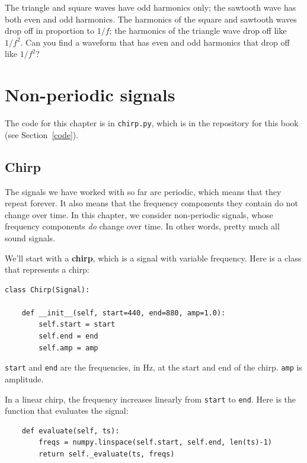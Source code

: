 \documentclass[12pt]{book}
\begin{document}
\begin{exercise}
The triangle and square waves have odd harmonics only; the sawtooth
wave has both even and odd harmonics.  The harmonics of the
square and sawtooth waves drop off in proportion to $1/f$; the
harmonics of the triangle wave drop off like $1/f^2$.  Can you
find a waveform that has even and odd harmonics that drop off
like $1/f^2$?
\end{exercise}



\chapter{Non-periodic signals}

The code for this chapter is in {\tt chirp.py}, which is in the
repository for this book (see Section~\ref{code}).


\section{Chirp}

The signals we have worked with so far are periodic, which means
that they repeat forever.  It also means that the frequency
components they contain do not change over time.
In this chapter, we consider non-periodic signals,
whose frequency components {\em do} change over time.
In other words, pretty much all sound signals.

We'll start with a {\bf chirp}, which is a signal with variable
frequency.  Here is a class that represents a chirp:

\begin{verbatim}
class Chirp(Signal):
    
    def __init__(self, start=440, end=880, amp=1.0):
        self.start = start
        self.end = end
        self.amp = amp
\end{verbatim}

{\tt start} and {\tt end} are the frequencies, in Hz, at the start
and end of the chirp.  {\tt amp} is amplitude.

In a linear chirp, the frequency increases linearly from {\tt start}
to {\tt end}.  Here is the function that evaluates the signal:

\begin{verbatim}
    def evaluate(self, ts):
        freqs = numpy.linspace(self.start, self.end, len(ts)-1)
        return self._evaluate(ts, freqs)
\end{verbatim}
\end{document}
